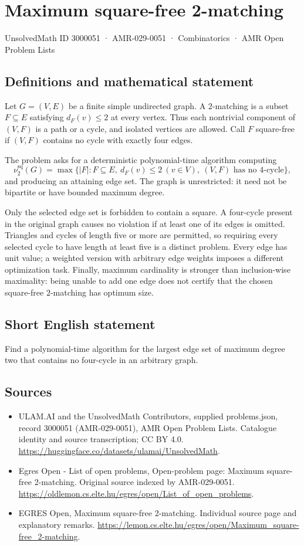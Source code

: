 \documentclass[11pt,a4paper]{article}
\begin{document}
\section*{Maximum square-free 2-matching}\label{3000051}
{\small UnsolvedMath ID 3000051 · AMR-029-0051 · Combinatorics · AMR Open Problem Lists}
\subsection{Definitions and mathematical statement}
Let $G=(V,E)$ be a finite simple undirected graph. A $2$-matching is
a subset $F\subseteq E$ satisfying $d_F(v)\le2$ at every vertex.
Thus each nontrivial component of $(V,F)$ is a path or a cycle,
and isolated vertices are allowed. Call $F$ square-free if $(V,F)$
contains no cycle with exactly four edges.

The problem asks for a deterministic polynomial-time algorithm
computing
\[
             \nu^{\mathrm{sq}}_2(G)=
             \max\{|F|:F\subseteq E,\ d_F(v)\le2\ (v\in V),
                                  \ (V,F)\text{ has no }4\text{-cycle}\},
\]
and producing an attaining edge set.
The graph is unrestricted: it need not be bipartite or have bounded
maximum degree.

Only the selected edge set is forbidden to contain a square. A
four-cycle present in the original graph causes no violation if at
least one of its edges is omitted. Triangles and cycles of length
five or more are permitted, so requiring every selected cycle to
have length at least five is a distinct problem. Every edge has unit
value; a weighted version with arbitrary edge weights imposes a
different optimization task. Finally, maximum cardinality is stronger
than inclusion-wise maximality: being unable to add one edge does not
certify that the chosen square-free $2$-matching has optimum size.
\subsection{Short English statement}
Find a polynomial-time algorithm for the largest edge set of
maximum degree two that contains no four-cycle in an arbitrary graph.
\subsection{Sources}
\begin{itemize}
\item[S1] ULAM.AI and the UnsolvedMath Contributors, supplied problems.json, record 3000051 (AMR-029-0051), AMR Open Problem Lists. Catalogue identity and source transcription; CC BY 4.0.
\url{https://huggingface.co/datasets/ulamai/UnsolvedMath}.
\item[S2] Egres Open - List of open problems, Open-problem page: Maximum square-free 2-matching. Original source indexed by AMR-029-0051.
\url{https://oldlemon.cs.elte.hu/egres/open/List_of_open_problems}.
\item[S3] EGRES Open, Maximum square-free 2-matching. Individual source page and explanatory remarks.
\url{https://lemon.cs.elte.hu/egres/open/Maximum_square-free_2-matching}.
\end{itemize}
\end{document}
